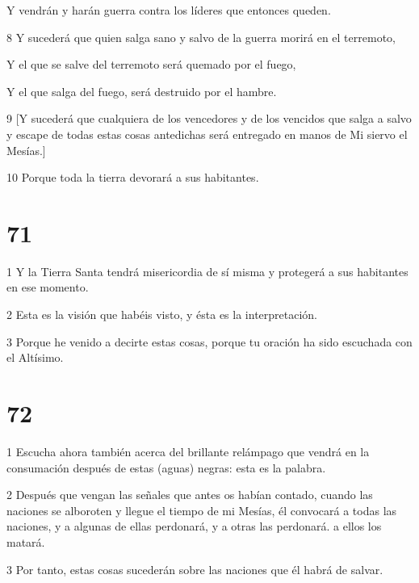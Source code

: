 \par Y vendrán y harán guerra contra los líderes que entonces queden.

\par 8 Y sucederá que quien salga sano y salvo de la guerra morirá en el terremoto,

\par Y el que se salve del terremoto será quemado por el fuego,

\par Y el que salga del fuego, será destruido por el hambre.

\par 9 [Y sucederá que cualquiera de los vencedores y de los vencidos que salga a salvo y escape de todas estas cosas antedichas será entregado en manos de Mi siervo el Mesías.]

\par 10 Porque toda la tierra devorará a sus habitantes.

\chapter{71}

\par 1 Y la Tierra Santa tendrá misericordia de sí misma y protegerá a sus habitantes en ese momento.

\par 2 Esta es la visión que habéis visto, y ésta es la interpretación.

\par 3 Porque he venido a decirte estas cosas, porque tu oración ha sido escuchada con el Altísimo.

\chapter{72}

\par 1 Escucha ahora también acerca del brillante relámpago que vendrá en la consumación después de estas (aguas) negras: esta es la palabra.

\par 2 Después que vengan las señales que antes os habían contado, cuando las naciones se alboroten y llegue el tiempo de mi Mesías, él convocará a todas las naciones, y a algunas de ellas perdonará, y a otras las perdonará. a ellos los matará.

\par 3 Por tanto, estas cosas sucederán sobre las naciones que él habrá de salvar.

